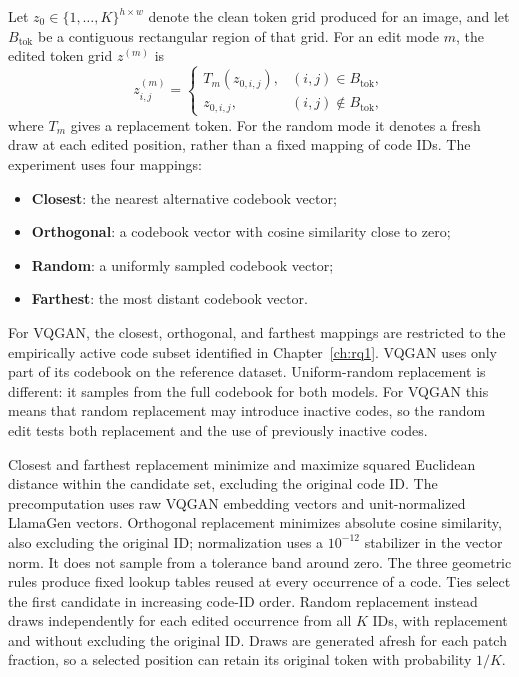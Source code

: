 Let $z_0 \in \{1,\ldots,K\}^{h \times w}$ denote the clean token grid produced
for an image, and let $B_{\mathrm{tok}}$ be a contiguous rectangular region of
that grid. For an edit mode $m$, the edited token grid $z^{(m)}$ is
\begin{equation}
    z^{(m)}_{i,j}
    =
    \begin{cases}
        T_m(z_{0,i,j}), & (i,j) \in B_{\mathrm{tok}}, \\
        z_{0,i,j}, & (i,j) \notin B_{\mathrm{tok}},
    \end{cases}
    \label{eq:rq4_token_edit}
\end{equation}
where $T_m$ gives a replacement token. For the random mode it denotes a fresh
draw at each edited position, rather than a fixed mapping of code IDs. The experiment
uses four mappings:
\begin{itemize}
    \item \textbf{Closest}: the nearest alternative codebook vector;
    \item \textbf{Orthogonal}: a codebook vector with cosine similarity close
          to zero;
    \item \textbf{Random}: a uniformly sampled codebook vector;
    \item \textbf{Farthest}: the most distant codebook vector.
\end{itemize}

For VQGAN, the
closest, orthogonal, and farthest mappings are restricted to the empirically
active code subset identified in Chapter~\ref{ch:rq1}. VQGAN uses only part of
its codebook on the reference dataset. Uniform-random
replacement is different: it samples from the full codebook for both models.
For VQGAN this means that random replacement may introduce inactive codes, so
the random edit tests both replacement and the use of previously inactive codes.

Closest and farthest replacement minimize and maximize squared Euclidean
distance within the candidate set, excluding the original code ID. The
precomputation uses raw VQGAN embedding vectors and unit-normalized LlamaGen
vectors. Orthogonal replacement minimizes absolute cosine similarity, also
excluding the original ID; normalization uses a $10^{-12}$ stabilizer in the
vector norm. It does not sample from a tolerance band around zero. The three
geometric rules produce fixed lookup tables reused at every occurrence of a
code. Ties select the first candidate in increasing code-ID order.
Random replacement instead draws independently for each edited occurrence
from all $K$ IDs, with replacement and without excluding the original ID.
Draws are generated afresh for each patch fraction, so a selected position
can retain its original token with probability $1/K$.

